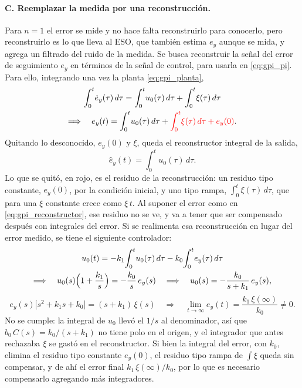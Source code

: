 \paragraph{C. Reemplazar la medida por una reconstrucción.} Para $n = 1$ el error se mide y no hace
falta reconstruirlo para conocerlo, pero reconstruirlo es lo que lleva al ESO, que también estima $e_y$
aunque se mida, y agrega un filtrado del ruido de la medida. Se busca reconstruir la
señal del error de seguimiento $e_y$ en términos de la señal de control, para usarla
en \eqref{eq:gpi_pi}. Para ello, integrando una vez la planta \eqref{eq:gpi_planta},
\begin{equation}
\begin{gathered}
\int_0^t\!\dot{e}_y(\tau)\,d\tau = \int_0^t\! u_0(\tau)\,d\tau + \int_0^t\! \xi(\tau)\,d\tau \\
\Longrightarrow\quad
e_y(t) = \int_0^t\! u_0(\tau)\,d\tau + \textcolor{red}{\int_0^t\! \xi(\tau)\,d\tau + e_y(0)} .
\end{gathered}
\end{equation}
Quitando lo desconocido, $e_y(0)$ y $\xi$, queda el reconstructor integral de
la salida,
\begin{equation}
\hat{e}_y(t) = \int_0^t\! u_0(\tau)\,d\tau .
\label{eq:gpi_reconstructor}
\end{equation}
Lo que se quitó, en rojo, es el residuo de la reconstrucción: un residuo tipo
constante, $e_y(0)$, por la condición inicial, y uno tipo rampa,
$\int_0^t \xi(\tau)\,d\tau$, que para una $\xi$ constante crece como $\xi\,t$. Al
suponer el error como en \eqref{eq:gpi_reconstructor}, ese residuo no se ve, y va
a tener que ser compensado después con integrales del error.
Si se realimenta esa reconstrucción en lugar del error medido, se tiene el siguiente controlador:
\begin{equation}
\begin{gathered}
u_0(t) = -k_1\!\int_0^t\! u_0(\tau)\,d\tau - k_0\!\int_0^t\! e_y(\tau)\,d\tau \\
\Longrightarrow\quad
u_0(s)\Bigl(1 + \frac{k_1}{s}\Bigr) = -\frac{k_0}{s}\,e_y(s)
\quad\Longrightarrow\quad
u_0(s) = -\frac{k_0}{s + k_1}\,e_y(s) ,
\end{gathered}
\end{equation}
\begin{equation}
e_y(s)\bigl[s^2 + k_1 s + k_0\bigr] = (s + k_1)\,\xi(s)
\quad\Longrightarrow\quad
\lim_{t\to\infty} e_y(t) = \frac{k_1\,\xi(\infty)}{k_0} \neq 0 .
\end{equation}
No se cumple: la integral de $u_0$ llevó el $1/s$ al denominador, así que
$b_0\,C(s) = k_0/(s + k_1)$ no tiene polo en el origen, y el integrador que antes rechazaba
$\xi$ se gastó en el reconstructor. Si bien la integral del error,
con $k_0$, elimina el residuo tipo constante $e_y(0)$, el residuo tipo rampa de
$\int \xi$ queda sin compensar, y de ahí el error final $k_1\,\xi(\infty)/k_0$, por lo que es necesario
compensarlo agregando más integradores.

